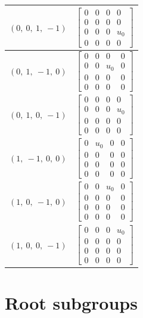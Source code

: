\documentclass[11pt]{article}
\theoremstyle{definition}
\begin{document}
\begin{longtable}{|l|c|}
    \hline
    $\left( 0, \  0, \  1, \  -1\right)$ & ${\left[\begin{matrix}0 & 0 & 0 & 0\\0 & 0 & 0 & 0\\0 & 0 & 0 & u_{0}\\0 & 0 & 0 & 0\end{matrix}\right]}$ \\
    \hline
    $\left( 0, \  1, \  -1, \  0\right)$ & ${\left[\begin{matrix}0 & 0 & 0 & 0\\0 & 0 & u_{0} & 0\\0 & 0 & 0 & 0\\0 & 0 & 0 & 0\end{matrix}\right]}$ \\
    \hline
    $\left( 0, \  1, \  0, \  -1\right)$ & ${\left[\begin{matrix}0 & 0 & 0 & 0\\0 & 0 & 0 & u_{0}\\0 & 0 & 0 & 0\\0 & 0 & 0 & 0\end{matrix}\right]}$ \\
    \hline
    $\left( 1, \  -1, \  0, \  0\right)$ & ${\left[\begin{matrix}0 & u_{0} & 0 & 0\\0 & 0 & 0 & 0\\0 & 0 & 0 & 0\\0 & 0 & 0 & 0\end{matrix}\right]}$ \\
    \hline
    $\left( 1, \  0, \  -1, \  0\right)$ & ${\left[\begin{matrix}0 & 0 & u_{0} & 0\\0 & 0 & 0 & 0\\0 & 0 & 0 & 0\\0 & 0 & 0 & 0\end{matrix}\right]}$ \\
    \hline
    $\left( 1, \  0, \  0, \  -1\right)$ & ${\left[\begin{matrix}0 & 0 & 0 & u_{0}\\0 & 0 & 0 & 0\\0 & 0 & 0 & 0\\0 & 0 & 0 & 0\end{matrix}\right]}$ \\
    \hline
\end{longtable}


\newpage
\section{Root subgroups}
\end{document}

